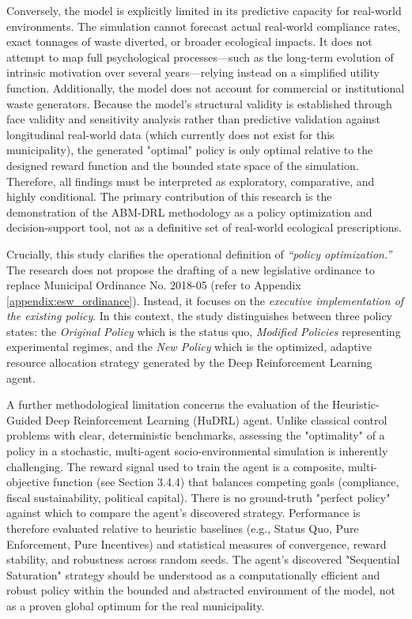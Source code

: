 Conversely, the model is explicitly limited in its predictive capacity for real-world environments. The simulation cannot forecast actual real-world compliance rates, exact tonnages of waste diverted, or broader ecological impacts. It does not attempt to map full psychological processes—such as the long-term evolution of intrinsic motivation over several years—relying instead on a simplified utility function. Additionally, the model does not account for commercial or institutional waste generators. Because the model's structural validity is established through face validity and sensitivity analysis rather than predictive validation against longitudinal real-world data (which currently does not exist for this municipality), the generated "optimal" policy is only optimal relative to the designed reward function and the bounded state space of the simulation. Therefore, all findings must be interpreted as exploratory, comparative, and highly conditional. The primary contribution of this research is the demonstration of the ABM-DRL methodology as a policy optimization and decision-support tool, not as a definitive set of real-world ecological prescriptions.

Crucially, this study clarifies the operational definition of \textit{``policy optimization.''} The research does not propose the drafting of a new legislative ordinance to replace Municipal Ordinance No. 2018-05 (refer to Appendix \ref{appendix:esw_ordinance}). Instead, it focuses on the \textit{executive implementation of the existing policy}. In this context, the study distinguishes between three policy states: the \textit{Original Policy} which is the status quo, \textit{Modified Policies} representing experimental regimes, and the \textit{New Policy} which is the optimized, adaptive resource allocation strategy generated by the Deep Reinforcement Learning agent.

A further methodological limitation concerns the evaluation of the Heuristic-Guided Deep Reinforcement Learning (HuDRL) agent. Unlike classical control problems with clear, deterministic benchmarks, assessing the "optimality" of a policy in a stochastic, multi-agent socio-environmental simulation is inherently challenging. The reward signal used to train the agent is a composite, multi-objective function (see Section 3.4.4) that balances competing goals (compliance, fiscal sustainability, political capital). There is no ground-truth "perfect policy" against which to compare the agent's discovered strategy. Performance is therefore evaluated relative to heuristic baselines (e.g., Status Quo, Pure Enforcement, Pure Incentives) and statistical measures of convergence, reward stability, and robustness across random seeds. The agent's discovered "Sequential Saturation" strategy should be understood as a computationally efficient and robust policy within the bounded and abstracted environment of the model, not as a proven global optimum for the real municipality.

